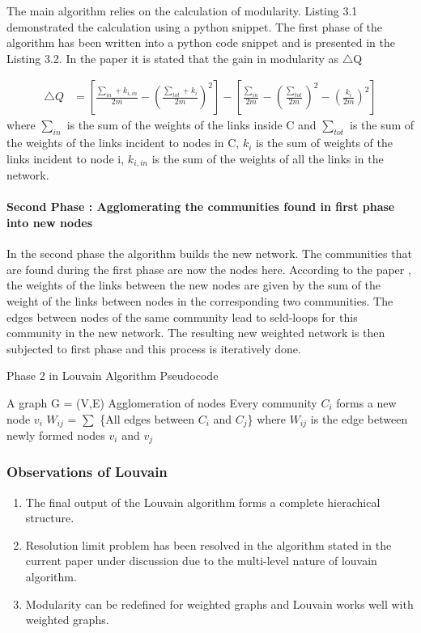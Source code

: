 \par The main algorithm relies on the calculation of modularity. Listing 3.1 demonstrated the calculation using a python snippet. The first phase of the algorithm has been written into a python code snippet and is presented in the Listing 3.2. 
In the paper it is stated that the gain in modularity as $\bigtriangleup$Q

\begin{equation}
\begin{split}
\bigtriangleup Q &= \left[ \frac{\sum_{in} + k_{i,in}}{2m} - \left( \frac{\sum_{tot} + k_{i}}{2m} \right)^2 \right] - \left[ \frac{\sum_{in}}{2m} - \left( \frac{\sum_{tot}}{2m} \right)^2 - \left( \frac{k_i}{2m} \right)^2 \right]
\end{split}
\end{equation}
where $\sum_{in}$ is the sum of the weights of the links inside C and $\sum_{tot}$ is the sum of the weights of the links incident to nodes in C, $k_i$ is the sum of weights of the links incident to node i, $k_{i,in}$ is the sum of the weights  of all the links in the network.

\paragraph{Second Phase : Agglomerating the communities found in first phase into new nodes}
In the second phase the algorithm builds the new network. The communities that are found during the first phase are now the nodes here. According to the paper \cite{louvain}, the weights of the links between the new nodes are given by the sum of the weight of the links between nodes in the corresponding two communities. The edges between nodes of the same community lead to seld-loops for this community in the new network. The resulting new weighted network is then subjected to first phase  and this process is iteratively done. 
\begin{algorithm}[H]

\caption{Phase 2 in Louvain Algorithm Pseudocode}
\begin{algorithmic} 
\REQUIRE A graph G = (V,E)
\ENSURE Agglomeration of nodes
\STATE Every community $C_i$ forms a new node $v_i$
\STATE $W_{ij}$ = $\sum$ \{All edges between $C_i$ and $C_j$\} where $W_{ij}$ is the edge between newly formed nodes $v_i$ and $v_j$
\end{algorithmic}
\end{algorithm}
\subsubsection{Observations of Louvain}
\begin{enumerate}
\item The final output of the Louvain algorithm forms a complete hierachical structure.
\item Resolution limit problem \cite{ResolLimit} has been resolved in the algorithm stated in the current paper under discussion \cite{louvain} due to the multi-level nature of louvain algorithm.
\item Modularity can be redefined for weighted graphs and Louvain works well with weighted graphs.
\end{enumerate}

